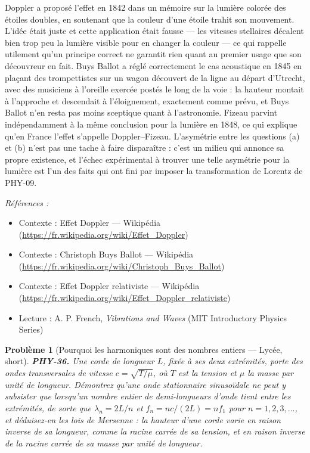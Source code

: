 \documentclass[11pt]{article}
\newtheorem{problem}{Problème}
\newenvironment{refs}{\par\small\noindent\emph{Références :}\begin{itemize}\setlength\itemsep{0pt}}{\end{itemize}\normalsize}
\begin{document}
\noindent Doppler a proposé l'effet en 1842 dans un mémoire sur la lumière colorée des
étoiles doubles, en soutenant que la couleur d'une étoile trahit son mouvement. L'idée était
juste et cette application était fausse --- les vitesses stellaires décalent bien trop peu la
lumière visible pour en changer la couleur --- ce qui rappelle utilement qu'un principe correct ne
garantit rien quant au premier usage que son découvreur en fait. Buys Ballot a réglé
correctement le cas acoustique en 1845 en plaçant des trompettistes sur un wagon découvert de la
ligne au départ d'Utrecht, avec des musiciens à l'oreille exercée postés le long de la voie : la
hauteur montait à l'approche et descendait à l'éloignement, exactement comme prévu, et Buys
Ballot n'en resta pas moins sceptique quant à l'astronomie. Fizeau parvint indépendamment à la
même conclusion pour la lumière en 1848, ce qui explique qu'en France l'effet s'appelle
Doppler--Fizeau. L'asymétrie entre les questions (a) et (b) n'est pas une tache à faire
disparaître : c'est un milieu qui annonce sa propre existence, et l'échec expérimental à trouver
une telle asymétrie pour la lumière est l'un des faits qui ont fini par imposer la transformation
de Lorentz de PHY-09.

\begin{refs}
\item Contexte : Effet Doppler --- Wikipédia (\url{https://fr.wikipedia.org/wiki/Effet_Doppler})
\item Contexte : Christoph Buys Ballot --- Wikipédia (\url{https://fr.wikipedia.org/wiki/Christoph_Buys_Ballot})
\item Contexte : Effet Doppler relativiste --- Wikipédia (\url{https://fr.wikipedia.org/wiki/Effet_Doppler_relativiste})
\item Lecture : A. P. French, \textit{Vibrations and Waves} (MIT Introductory Physics Series)
\end{refs}

\bigskip

\begin{problem}[{Pourquoi les harmoniques sont des nombres entiers --- Lycée, short}]
\textbf{PHY-36.} Une corde de longueur $ L $, fixée à ses deux extrémités,
porte des ondes transversales de vitesse $ c = \sqrt{T/\mu} $, où $ T $ est la tension et
$ \mu $ la masse par unité de longueur. Démontrez qu'une onde stationnaire sinusoïdale ne peut
y subsister que lorsqu'un nombre entier de demi-longueurs d'onde tient entre les extrémités, de
sorte que $ \lambda_{n} = 2L/n $ et $ f_{n} = nc/(2L) = n f_{1} $ pour
$ n = 1, 2, 3, \dots $, et déduisez-en les lois de Mersenne : la hauteur d'une corde varie en
raison inverse de sa longueur, comme la racine carrée de sa tension, et en raison inverse de la
racine carrée de sa masse par unité de longueur.
\end{problem}
\end{document}

